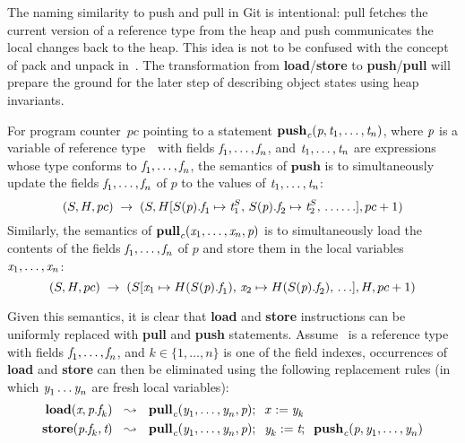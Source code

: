 The naming similarity to push and pull
in \textsf{Git} is intentional: pull fetches the current version of a
reference type from the heap and push communicates the local changes
back to the heap. This idea is not to be confused with the concept of
pack and unpack in~\cite{leino2004object}. The transformation from
\textbf{load}/\textbf{store} to \textbf{push}/\textbf{pull} will
prepare the ground for the later step of describing object states
using heap invariants.

For program counter~$pc$ pointing to a statement
$\textbf{push}_\textit{c}(\textit{p}, \textit{t}_1,\ldots,\textit{t}_n)$, where $\textit{p}$ is
a variable of reference type~\cvar\ with fields
$\textit{f}_1,\ldots,\textit{f}_n$, and $\textit{t}_1,\ldots,\textit{t}_n$ are expressions
whose type conforms to $\textit{f}_1,\ldots,\textit{f}_n$, the semantics of
$\textbf{push}$ is to simultaneously update the fields
$\textit{f}_1,\ldots,\textit{f}_n$ of $p$ to the values of
$\textit{t}_1,\ldots,\textit{t}_n$:
\[
(S,H,pc) \;\rightarrow\;
(S, H[S(\textit{p}).\textit{f}_1 \mapsto \textit{t}_1^S,\,
S(\textit{p}).\textit{f}_2 \mapsto \textit{t}_2^S,\, \ldots
\ldots], pc+1)
\]
%
Similarly, the semantics of
$\textbf{pull}_\textit{c}(\textit{x}_1,\ldots,\textit{x}_n, \textit{p})$ is to
simultaneously load the contents of the fields
$\textit{f}_1,\ldots,\textit{f}_n$ of $p$ and store them in the local variables
$\textit{x}_1,\ldots,\textit{x}_n$:
\[
(S,H,pc)
\;\rightarrow\;
(S[\textit{x}_1 \mapsto H(S(\textit{p}).\textit{f}_1),\,
\textit{x}_2\mapsto H(S(\textit{p}).\textit{f}_2),\,
\ldots], H, pc+1)
\]

Given this semantics, it is clear that \textbf{load} and
\textbf{store} instructions can be uniformly replaced with
\textbf{pull} and \textbf{push} statements.
%
Assume \cvar\ is a reference type with fields
$\textit{f}_1,\ldots,\textit{f}_n$, and $k \in \{1, \ldots, n\}$ is one of
the field indexes, occurrences of \textbf{load} and \textbf{store} can
then be eliminated using the following replacement rules (in which
$\textit{y}_1 \ldots \textit{y}_n$ are fresh local variables):
\begin{align}
  \label{eq:loadRepl}
  \textbf{load}(\textit{x}, \textit{p}.\textit{f}_k) &~~\leadsto~~
  \textbf{pull}_\textit{c}(\textit{y}_1,\ldots,\textit{y}_n, \textit{p});\;\; x:=\textit{y}_k
  \\
  \label{eq:storeRepl}
  \textbf{store}(\textit{p}.\textit{f}_k, \textit{t}) &~~\leadsto~~
  \textbf{pull}_\textit{c}(\textit{y}_1,\ldots,\textit{y}_n, \textit{p});\;\;
  \textit{y}_k := \textit{t};\;\;
  \textbf{push}_\textit{c}(\textit{p}, \textit{y}_1,\ldots,\textit{y}_n)
\end{align}



